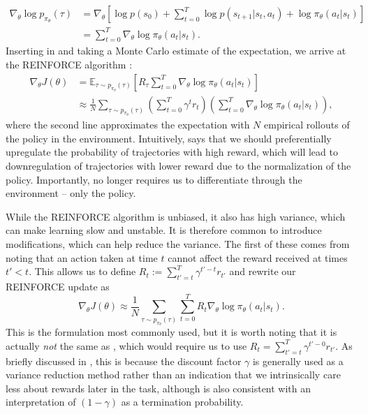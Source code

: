 \begin{align}
    \label{eq:deriv_log_ptau}
    \nabla_\theta \log p_{\pi_\theta}(\tau) & = \nabla_\theta \left [ \log p(s_0) + \sum_{t=0}^T \log p(s_{t+1} | s_t, a_t) + \log \pi_\theta (a_t|s_t) \right ] \\
                                      & = \sum_{t=0}^T \nabla_\theta \log \pi_\theta (a_t|s_t).
\end{align}
Inserting  in  and taking a Monte Carlo estimate of the expectation, we arrive at the REINFORCE algorithm \citep{williams1992simple}:
\begin{align}
    \nabla_\theta J(\theta) & = \mathbb{E}_{\tau \sim p_{\pi_\theta}(\tau)} \left [ R_\tau \sum_{t=0}^T \nabla_\theta \log \pi_\theta (a_t|s_t) \right ]                                         \\
                            & \approx \frac{1}{N} \sum_{\tau \sim p_{\pi_\theta}(\tau)} \left ( \sum_{t=0}^T \gamma^t r_t \right ) \left ( \sum_{t=0}^T \nabla_\theta \log \pi_\theta (a_t|s_t) \right ),
    \label{eq:orig_reinforce}
\end{align}
where the second line approximates the expectation with $N$ empirical rollouts of the policy in the environment.
Intuitively,  says that we should preferentially upregulate the probability of trajectories with high reward, which will lead to downregulation of trajectories with lower reward due to the normalization of the policy.
Importantly,  no longer requires us to differentiate through the environment -- only the policy.

While the REINFORCE algorithm is unbiased, it also has high variance, which can make learning slow and unstable.
It is therefore common to introduce modifications, which can help reduce the variance.
The first of these comes from noting that an action taken at time $t$ cannot affect the reward received at times $t'<t$.
This allows us to define $R_t := \sum_{t'=t}^T \gamma^{t'-t} r_{t'}$ and rewrite our REINFORCE update as
\begin{equation}
    \label{eq:reinforce}
    \nabla_\theta J(\theta) \approx \frac{1}{N} \sum_{\tau \sim p_{\pi_\theta}(\tau)}  \sum_{t=0}^T R_t \nabla_\theta \log \pi_\theta (a_t|s_t).
\end{equation}
This is the formulation most commonly used, but it is worth noting that it is actually \emph{not} the same as , which would require us to use $R_t= \sum_{t'=t}^T \gamma^{t'-0} r_{t'}$.
As briefly discussed in , this is because the discount factor $\gamma$ is generally used as a variance reduction method rather than an indication that we intrinsically care less about rewards later in the task, although  is also consistent with an interpretation of $(1-\gamma)$ as a termination probability.

